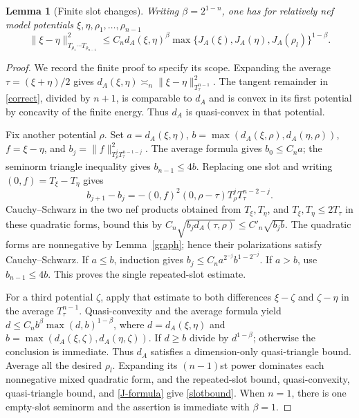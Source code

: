 \documentclass[10pt]{article}
\newtheorem{lemma}[theorem]{Lemma}
\begin{document}
\begin{lemma}[Finite slot changes]\label{slots}
Writing $\beta=2^{1-n}$, one has for relatively nef model potentials
$\xi,\eta,\rho_1,\ldots,\rho_{n-1}$
\begin{equation}\label{slotbound}
 \|\xi-\eta\|_{T_{\rho_1}\cdots T_{\rho_{n-1}}}^2
 \leq C_n d_A(\xi,\eta)^\beta
       \max\{J_A(\xi),J_A(\eta),J_A(\rho_l)\}^{1-\beta}.
\end{equation}
\end{lemma}
\begin{proof}
We record the finite proof to specify its scope. Expanding the average
$\tau=(\xi+\eta)/2$ gives
$d_A(\xi,\eta)\asymp_n\|\xi-\eta\|_{T_\tau^{n-1}}^2$.
The tangent remainder in \eqref{correct}, divided by $n+1$, is
comparable to $d_A$ and is convex in its first potential by concavity
of the finite energy. Thus $d_A$ is quasi-convex in that potential.

Fix another potential $\rho$. Set $a=d_A(\xi,\eta)$,
$b=\max(d_A(\xi,\rho),d_A(\eta,\rho))$, $f=\xi-\eta$, and
$b_j=\|f\|_{T_\rho^jT_\tau^{n-1-j}}^2$.
The average formula gives $b_0\leq C_na$; the seminorm triangle
inequality gives $b_{n-1}\leq4b$.
Replacing one slot and writing $(0,f)=T_\xi-T_\eta$ gives
\[
 b_{j+1}-b_j=-(0,f)^2(0,\rho-\tau)
                       T_\rho^jT_\tau^{n-2-j}.
\]
Cauchy--Schwarz in the two nef products obtained from $T_\xi,T_\eta$,
and $T_\xi,T_\eta\leq2T_\tau$ in these quadratic forms, bound this
by $C_n\sqrt{b_jd_A(\tau,\rho)}\leq C'_n\sqrt{b_jb}$.
The quadratic forms are nonnegative by Lemma~\ref{graph}; hence their
polarizations satisfy Cauchy--Schwarz. If $a\leq b$, induction gives
$b_j\leq C_na^{2^{-j}}b^{1-2^{-j}}$. If $a>b$, use $b_{n-1}\leq4b$.
This proves the single repeated-slot estimate.

For a third potential $\zeta$, apply that estimate to both differences
$\xi-\zeta$ and $\zeta-\eta$ in the average $T_\tau^{n-1}$.
Quasi-convexity and the average formula yield
$d\leq C_nb^\beta\max(d,b)^{1-\beta}$, where
$d=d_A(\xi,\eta)$ and $b=\max(d_A(\xi,\zeta),d_A(\eta,\zeta))$.
If $d\geq b$ divide by $d^{1-\beta}$; otherwise the conclusion is
immediate. Thus $d_A$ satisfies a dimension-only quasi-triangle bound.
Average all the desired $\rho_l$. Expanding its $(n-1)$st power
dominates each nonnegative mixed quadratic form, and the repeated-slot
bound, quasi-convexity, quasi-triangle bound, and \eqref{J-formula}
give \eqref{slotbound}. When $n=1$, there is one empty-slot seminorm
and the assertion is immediate with $\beta=1$.
\end{proof}
\end{document}
